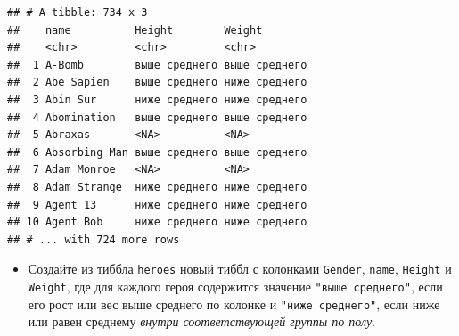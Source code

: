 \documentclass[]{book}
\newenvironment{Shaded}{\begin{snugshade}}{\end{snugshade}}
\newcommand{\KeywordTok}[1]{\textcolor[rgb]{0.13,0.29,0.53}{\textbf{#1}}}
\newcommand{\DataTypeTok}[1]{\textcolor[rgb]{0.13,0.29,0.53}{#1}}
\newcommand{\StringTok}[1]{\textcolor[rgb]{0.31,0.60,0.02}{#1}}
\newcommand{\OtherTok}[1]{\textcolor[rgb]{0.56,0.35,0.01}{#1}}
\newcommand{\ControlFlowTok}[1]{\textcolor[rgb]{0.13,0.29,0.53}{\textbf{#1}}}
\newcommand{\OperatorTok}[1]{\textcolor[rgb]{0.81,0.36,0.00}{\textbf{#1}}}
\newcommand{\NormalTok}[1]{#1}
\providecommand{\tightlist}{%
  \setlength{\itemsep}{0pt}\setlength{\parskip}{0pt}}
\begin{document}
\begin{Shaded}
\end{Shaded}

\begin{verbatim}
## # A tibble: 734 x 3
##    name          Height        Weight       
##    <chr>         <chr>         <chr>        
##  1 A-Bomb        выше среднего выше среднего
##  2 Abe Sapien    выше среднего ниже среднего
##  3 Abin Sur      ниже среднего ниже среднего
##  4 Abomination   выше среднего выше среднего
##  5 Abraxas       <NA>          <NA>         
##  6 Absorbing Man выше среднего выше среднего
##  7 Adam Monroe   <NA>          <NA>         
##  8 Adam Strange  ниже среднего ниже среднего
##  9 Agent 13      ниже среднего ниже среднего
## 10 Agent Bob     ниже среднего ниже среднего
## # ... with 724 more rows
\end{verbatim}

\begin{itemize}
\tightlist
\item
  Создайте из тиббла \texttt{heroes} новый тиббл с колонками
  \texttt{Gender}, \texttt{name}, \texttt{Height} и \texttt{Weight}, где
  для каждого героя содержится значение \texttt{"выше\ среднего"}, если
  его рост или вес выше среднего по колонке и \texttt{"ниже\ среднего"},
  если ниже или равен среднему \emph{внутри соответствующей группы по
  полу}.
\end{itemize}

\begin{Shaded}
\end{Shaded}
\end{document}

